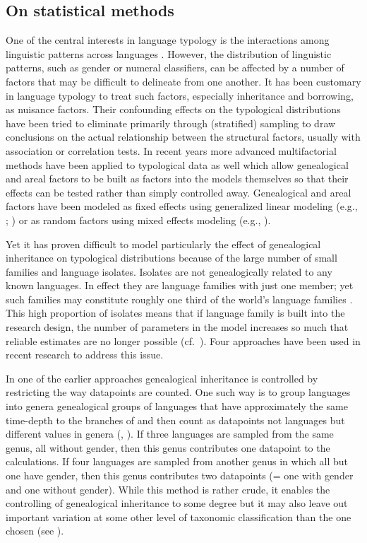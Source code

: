 \documentclass[output=collectionpaper]{langsci/langscibook}
\begin{document}
\subsection{On statistical methods}
\label{sec:Sinne:3.2}

One of the central interests in language typology is the interactions among linguistic patterns across languages \citep{Bickel2007a}. However, the distribution of linguistic patterns, such as gender or numeral classifiers, can be affected by a number of factors that may be difficult to delineate from one another. It has been customary in language typology to treat such factors, especially inheritance and borrowing, as nuisance factors. Their confounding effects on the typological distributions have been tried to eliminate primarily through (stratified) sampling to draw conclusions on the actual relationship between the structural factors, usually with association or correlation tests. In recent years more advanced multifactorial methods have been applied to typological data as well which allow genealogical and areal factors to be built as factors into the models themselves so that their effects can be tested rather than simply controlled away. Genealogical and areal factors have been modeled as fixed effects using generalized linear modeling (e.g., \citealt{Cysouw2010}; \citealt{Sinnemaeki2010}) or as random factors using mixed effects modeling (e.g., \citealt{Bentz2013}).

Yet it has proven difficult to model particularly the effect of genealogical inheritance on typological distributions because of the large number of small families and language isolates. Isolates are not genealogically related to any known languages. In effect they are language families with just one member; yet such families may constitute roughly one third of the world's language families \citep{Campbell2016}. This high proportion of isolates means that if language family is built into the research design, the number of parameters in the model increases so much that reliable estimates are no longer possible (cf.\ \citealt[877--880]{Sinnemaeki2010}). Four approaches have been used in recent research to address this issue.

In one of the earlier approaches genealogical inheritance is controlled by restricting the way datapoints are counted. One such way is to group languages into genera \textendash{} genealogical groups of languages that have approximately the same time-depth to the branches of  \textendash{} and then count as datapoints not languages but different values in genera (\citealt{Dryer1992}, \citealt*{Dryer2000}). If three languages are sampled from the same genus, all without gender, then this genus contributes one datapoint to the calculations. If four languages are sampled from another genus in which all but one have gender, then this genus contributes two datapoints (= one with gender and one without gender). While this method is rather crude, it enables the controlling of genealogical inheritance to some degree but it may also leave out important variation at some other level of taxonomic classification than the one chosen (see \citealt{Bickel2008}).
\end{document}
